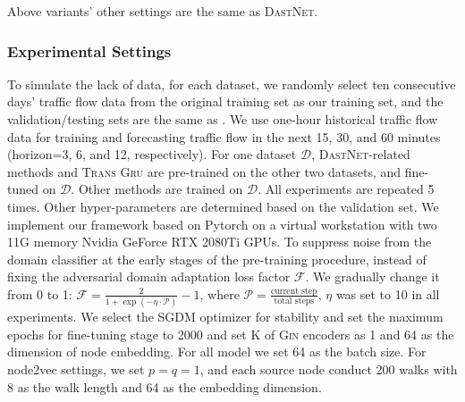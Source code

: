 \documentclass[sigconf]{acmart}
\theoremstyle{definition}
\begin{document}
Above variants' other settings are the same as \textsc{DastNet}.


\subsubsection{Experimental Settings}
To simulate the lack of data, for each dataset, we randomly select ten consecutive days' traffic flow data from the original training set as our training set, and the validation/testing sets are the same as \cite{li2021dynamic}.
We use one-hour historical traffic flow data for training and forecasting traffic flow in the next 15, 30, and 60 minutes (horizon=3, 6, and 12, respectively). For one dataset $\mathcal{D}$, \textsc{DastNet}-related methods and \textsc{Trans Gru} are pre-trained on the other two datasets, and fine-tuned on $\mathcal{D}$. Other methods are trained on $\mathcal{D}$. All experiments are repeated 5 times. Other hyper-parameters are determined based on the validation set. We implement our framework based on Pytorch \cite{paszke2019pytorch} on a virtual workstation with two 11G memory Nvidia GeForce RTX 2080Ti GPUs. To suppress noise from the domain classifier at the early stages of the pre-training procedure, instead of fixing the adversarial domain adaptation loss factor $\mathcal{F}$. We gradually change it from 0 to 1: $\mathcal{F}=\frac{2}{1+\exp (-\eta \cdot \mathcal{P})}-1$, where $\mathcal{P}= \frac{\text{current step}}{\text{total steps}}$, $\eta$ was set to 10 in all experiments. We select the SGDM optimizer for stability and set the maximum epochs for fine-tuning stage to 2000 and set K of \textsc{Gin} encoders as 1 and 64 as the dimension of node embedding. For all model we set 64 as the batch size. 
For node2vec settings, we set $p=q=1$, and each source node conduct 200 walks with 8 as the walk length and 64 as the embedding dimension.
\end{document}
